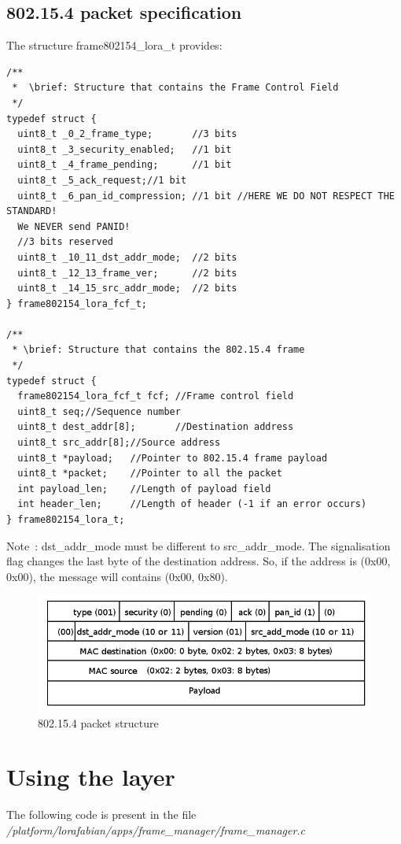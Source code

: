 \documentclass{article}
\begin{document}
\subsection{802.15.4 packet specification}
The structure frame802154\_lora\_t provides:
\begin{verbatim}
/**
 *  \brief: Structure that contains the Frame Control Field
 */
typedef struct {
  uint8_t _0_2_frame_type;       //3 bits
  uint8_t _3_security_enabled;   //1 bit
  uint8_t _4_frame_pending;      //1 bit
  uint8_t _5_ack_request;//1 bit
  uint8_t _6_pan_id_compression; //1 bit //HERE WE DO NOT RESPECT THE STANDARD! 
  We NEVER send PANID!
  //3 bits reserved
  uint8_t _10_11_dst_addr_mode;  //2 bits
  uint8_t _12_13_frame_ver;      //2 bits
  uint8_t _14_15_src_addr_mode;  //2 bits
} frame802154_lora_fcf_t;

/**
 * \brief: Structure that contains the 802.15.4 frame
 */
typedef struct {
  frame802154_lora_fcf_t fcf; //Frame control field
  uint8_t seq;//Sequence number
  uint8_t dest_addr[8];       //Destination address
  uint8_t src_addr[8];//Source address
  uint8_t *payload;   //Pointer to 802.15.4 frame payload
  uint8_t *packet;    //Pointer to all the packet
  int payload_len;    //Length of payload field
  int header_len;     //Length of header (-1 if an error occurs)
} frame802154_lora_t;
\end{verbatim}
Note~: dst\_addr\_mode must be different to src\_addr\_mode. The signalisation flag changes the last byte of the destination address. So, if the address is (0x00, 0x00), the message will contains (0x00, 0x80).\\
\begin{figure}[h]
	\begin{center}
		\includegraphics[scale=0.5]{img/trame}
		\caption{802.15.4 packet structure}
		\label{fig:trame802154}
	\end{center}
\end{figure}
\section{Using the layer}
The following code is present in the file \\
\emph{/platform/lorafabian/apps/frame\_manager/frame\_manager.c}
\end{document}
